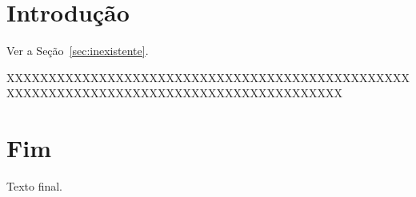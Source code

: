 \documentclass{article}
\begin{document}
\section{Introdução}


Ver a Seção~\ref{sec:inexistente}.

\noindent\hbox{XXXXXXXXXXXXXXXXXXXXXXXXXXXXXXXXXXXXXXXXXXXXXXXXXXXXXXXXXXXXXXXXXXXXXXXXXXXXXXXXXXXXXXXX}

\section{Fim}
Texto final.
\end{document}
